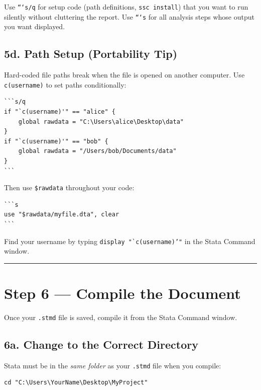 \documentclass[paper=a4, fontsize=11pt]{scrartcl}
\newcommand{\horrule}[1]{\rule{\linewidth}{#1}}
\begin{document}
\medskip
Use \texttt{```s/q} for setup code (path definitions, \texttt{ssc install}) that you
want to run silently without cluttering the report. Use \texttt{```s} for all
analysis steps whose output you want displayed.

\subsection*{5d. Path Setup (Portability Tip)}

Hard-coded file paths break when the file is opened on another computer. Use
\texttt{c(username)} to set paths conditionally:

\begin{lstlisting}[style=stata]
```s/q
if "`c(username)'" == "alice" {
    global rawdata = "C:\Users\alice\Desktop\data"
}
if "`c(username)'" == "bob" {
    global rawdata = "/Users/bob/Documents/data"
}
```
\end{lstlisting}

Then use \texttt{\$rawdata} throughout your code:

\begin{lstlisting}[style=stata]
```s
use "$rawdata/myfile.dta", clear
```
\end{lstlisting}

Find your username by typing \texttt{display "`c(username)'"} in the Stata Command
window.

\bigskip\horrule{0.4pt}\bigskip

\section{Step 6 --- Compile the Document}

Once your \texttt{.stmd} file is saved, compile it from the Stata Command window.

\subsection*{6a. Change to the Correct Directory}

Stata must be in the \textit{same folder} as your \texttt{.stmd} file when you compile:

\begin{lstlisting}[style=stata]
cd "C:\Users\YourName\Desktop\MyProject"
\end{lstlisting}
\end{document}
